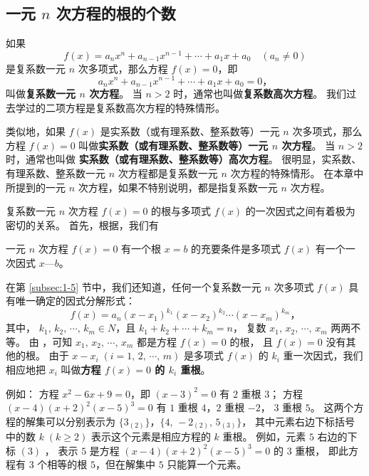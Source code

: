 \subsection{一元 $n$ 次方程的根的个数}\label{subsec:1-6}

如果
$$ f(x) = a_n x^n + a_{n-1}x^{n-1} + \cdots + a_1x + a_0 \quad (a_n \neq 0) $$
是复系数一元 $n$ 次多项式，那么方程 $f(x) = 0$，即
$$ a_n x^n + a_{n-1}x^{n-1} + \cdots + a_1x + a_0 = 0 \text{，} $$
叫做\textbf{复系数一元 $n$ 次方程}。 当 $n > 2$ 时，通常也叫做\textbf{复系数高次方程}。
我们过去学过的二项方程是复系数高次方程的特殊情形。

类似地，如果 $f(x)$ 是实系数（或有理系数、整系数等）一元 $n$ 次多项式，那么方程 $f(x) = 0$
叫做\textbf{实系数（或有理系数、整系数等）一元 $n$ 次方程}。 当 $n > 2$ 时，通常也叫做
\textbf{实系数（或有理系数、整系数等）高次方程}。
很明显，实系数、有理系数、整系数一元 $n$ 次方程都是复系数一元 $n$ 次方程的特殊情形。
在本章中所提到的一元 $n$ 次方程，如果不特别说明，都是指复系数一元 $n$ 次方程。

复系数一元 $n$ 次方程 $f(x) = 0$ 的根与多项式 $f(x)$ 的一次因式之间有着极为密切的关系。
首先，根据，我们有

\begin{theorem} \label{theorem:yyncfc-1}
一元 $n$ 次方程 $f(x) = 0$ 有一个根 $x = b$ 的充要条件是多项式 $f(x)$ 有一个一次因式 $x — b$。
\end{theorem}

在第 \ref{subsec:1-5} 节中，我们还知道，任何一个复系数一元 $n$ 次多项式 $f(x)$ 具有唯一确定的因式分解形式：
$$ f(x) = a_n(x - x_1)^{k_1} (x - x_2)^{k_2} \cdots (x - x_m)^{k_m} \text{，} $$
其中， $k_1,\, k_2,\, \cdots,\, k_m \in N$，且 $k_1 + k_2 + \cdots + k_m = n$，
复数 $x_1,\, x_2,\, \cdots,\, x_m$ 两两不等。
由 ，可知 $x_1,\, x_2,\, \cdots,\, x_m$ 都是方程 $f(x) = 0$ 的根，
且 $f(x) = 0$  没有其他的根。
由于 $x - x_i \; (i = 1,\, 2,\, \cdots,\, m)$ 是多项式 $f(x)$
的 $k_i$ 重一次因式，我们相应地把 $x_i$ 叫做\textbf{方程 $f(x) = 0$ 的 $k_i$ 重根}。


例如： 方程 $x^2 - 6x + 9 = 0$，即 $(x - 3)^2 = 0$ 有 $2$ 重根 $3$；
方程 $(x -4) (x + 2)^2 (x - 5)^3 = 0$ 有 $1$ 重根 $4$，$2$ 重根 $-2$， $3$ 重根 $5$。
这两个方程的解集可以分别表示为 $\{ 3_{(2)} \}$，$\{ 4,\, -2_{(2)},\, 5_{(3)} \}$，
其中元素右边下标括号中的数 $k \; (k \geqslant 2)$ 表示这个元素是相应方程的 $k$ 重根。
例如，元素 $5$ 右边的下标 $(3)$ ， 表示 $5$ 是方程 $(x -4) (x + 2)^2 (x - 5)^3 = 0$ 的 $3$ 重根，
即此方程有 $3$ 个相等的根 $5$，但在解集中 $5$ 只能算一个元素。


